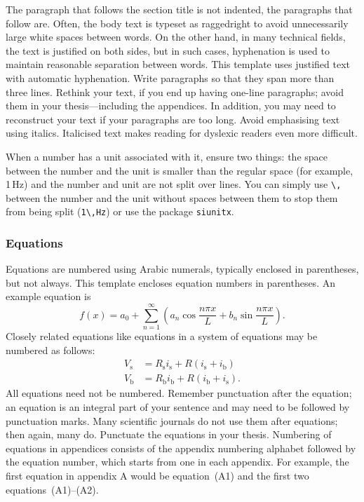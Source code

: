 \documentclass[english, 12pt, a4paper, biz, utf8, a-2b, online]{aaltothesis}
\begin{document}
The paragraph that follows the section title is not indented, the paragraphs 
that follow are. Often, the body text is typeset as raggedright to avoid 
unnecessarily large white spaces between words. On the other hand, in many 
technical fields, the text is justified on both sides, but in such cases, 
hyphenation is used to maintain reasonable separation between words. This 
template uses justified text with automatic hyphenation. Write paragraphs so 
that they span more than three lines. Rethink your text, if you end up having  
one-line paragraphs; avoid them in your thesis---including the appendices. In 
addition, you may need to reconstruct your text if your paragraphs are too long.
Avoid emphasising text using italics. Italicised text makes reading for dyslexic
readers even more difficult.

When a number has a unit associated with it, ensure two things: the space 
between the number and the unit is smaller than the regular space (for example, 
1\,Hz) and the number and unit are not split over lines. You can simply use 
\verb+\,+ between the number and the unit without spaces between them to stop 
them from being split (\verb+1\,Hz+) or use the package \verb+siunitx+.


\subsubsection{Equations}

Equations are numbered using Arabic numerals, typically enclosed in parentheses,
but not always. This template encloses equation numbers in parentheses. An 
example equation is
\begin{equation}
	f(x) = a_0 + \sum_{n=1}^{\infty} \left( a_n \cos\frac{n\pi x}{L} + 
	b_n \sin\frac{n\pi x}{L} \right).
\end{equation}
Closely related equations like equations in a system of equations may be numbered 
as follows:
\begin{subequations}\label{eq:ohm}
  \begin{alignat}{1}
	V_\text{s} &= R_\text{s} i_\text{s} + R(i_\text{s} + i_\text{b})
	 \label{eq:ohm1}\\
	V_\text{b} &= R_\text{b} i_\text{b} + R(i_\text{b} + i_\text{s}).
	 \label{eq:ohm2}
  \end{alignat}
\end{subequations}
All equations need not be numbered. Remember punctuation after the equation; an
equation is an integral part of your sentence and may need to be followed by 
punctuation marks. Many scientific journals do not use them after equations;
then again, many do. Punctuate the equations in your thesis. Numbering of
equations in appendices consists of the appendix numbering alphabet followed by
the equation number, which starts from one in each appendix. For example, the
first equation in appendix A would be equation~(A1) and the first two 
equations~(A1)--(A2).
\end{document}

